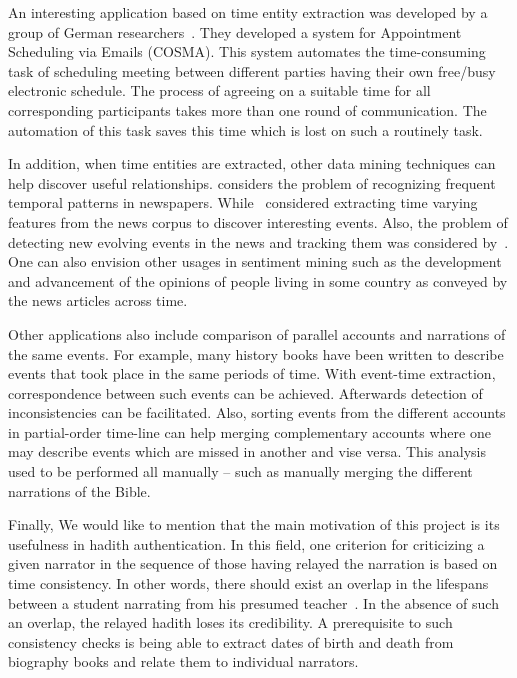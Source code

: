 \documentclass[a4,12pt]{report}
\begin{document}
An interesting application based on time entity extraction was developed by a group of German researchers~\cite{Busemann:97}.
They developed a system for Appointment Scheduling via Emails (COSMA). This system automates the time-consuming task of
scheduling meeting between different parties having their own free/busy electronic schedule. The process of agreeing on
a suitable time for all corresponding participants takes more than one round of communication. The automation of this task
saves this time which is lost on such a routinely task. 

In addition, when time entities are extracted, other data mining techniques can help discover useful relationships.
\cite{Berlanga:98} considers the problem of recognizing frequent temporal patterns in newspapers. While~\cite{Swan:99}
considered extracting time varying features from the news corpus to discover interesting events. Also, the problem of detecting
new evolving events in the news and tracking them was considered by~\cite{Allan:98}. One can also envision other usages in 
sentiment mining such as the development and advancement of the opinions of people living in some country as conveyed by the 
news articles across time.

Other applications also include comparison of parallel accounts and narrations of the same events. For example, many history 
books have been written to describe events that took place in the same periods of time. With event-time extraction, correspondence
between such events can be achieved. Afterwards detection of inconsistencies can be facilitated. Also, sorting events from the 
different accounts in partial-order time-line can help merging complementary accounts where one may describe events which are 
missed in another and vise versa. This analysis used to be performed all manually -- 
such as manually merging the different narrations of 
the Bible.

Finally, We would like to mention that the main motivation of this project is its usefulness in hadith authentication. 
In this field, one criterion for criticizing a given narrator
in the sequence of those having relayed the narration is based on 
time consistency. In other words, there should exist an overlap in the lifespans 
between a student narrating from his presumed 
teacher~\cite{Al-Azami-91}. In the absence of such an overlap, the relayed hadith loses its credibility.
A prerequisite to such consistency checks is being able to extract dates of birth and death from biography books and relate
them to individual narrators.
\end{document}
